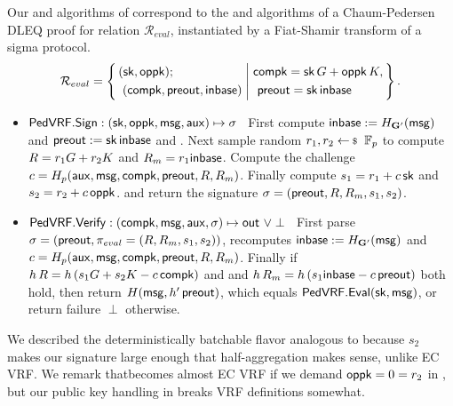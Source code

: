 Our \Sign and \Verify algorithms of \PedVRF correspond to
the \Prove and \Verify algorithms of a Chaum-Pedersen DLEQ proof
 for relation $\mathcal{R}_{eval}$,
instantiated by a Fiat-Shamir transform of a sigma protocol.
$$ \mathcal{R}_{eval} = \Setst{
  \begin{aligned}
    & (\sk, \openpk); \\ 
    & \,\, (\compk,\PreOut,\In) 
  \end{aligned}
}{
  \begin{aligned}
    & \compk = \sk\,\genG + \openpk\,\genB, \\
    & \,\, \PreOut = \sk\,\In 
  \end{aligned}
}  \mathperiod \label{rel:commit} 
$$
%
\begin{itemize}
	\item ${\mathsf{PedVRF}}.{\mathsf{Sign}} : (\mathsf{sk},\mathsf{oppk},\mathsf{msg},\mathsf{aux}) \mapsto \sigma$ \,
	First compute ${\mathsf{inbase}} := H_{{\mathbf{G}'}}(\mathsf{msg})$ and ${\mathsf{preout}} := \mathsf{sk} \, {\mathsf{inbase}}$ and \compk.
	Next sample random $r_1,r_2 \leftsample \F_p$
	to compute $R = r_1 G + r_2 K$ and $R_m = r_1 {\mathsf{inbase}}$.
	Compute the challenge $c = H_p(\mathsf{aux},\mathsf{msg},\mathsf{compk},{\mathsf{preout}},R,R_m)$.
	Finally compute $s_1 = r_1 + c \, \mathsf{sk}$ and $s_2 = r_2 + c \, \mathsf{oppk}$.
	and return the signature $\sigma = ({\mathsf{preout}},R,R_m,s_1,s_2)$.

	\item ${\mathsf{PedVRF}}.{\mathsf{Verify}} : (\mathsf{compk},\mathsf{msg},\mathsf{aux},\sigma) \mapsto {\ensuremath{\mathsf{out}}} \,\, \lor \perp$ \,
	First parse $\sigma = ({\mathsf{preout}}, \pi_{eval} = (R,R_m,s_1,s_2))$,
	recomputes ${\mathsf{inbase}} := H_{{\mathbf{G}'}}(\mathsf{msg})$ and 
	$c = H_p(\mathsf{aux},\mathsf{msg},\mathsf{compk},{\mathsf{preout}},R,R_m)$.
    Finally if $h \, R = h \, (s_1 G + s_2 K - c \, \mathsf{compk})$ and
    and $h \, R_m = h \, (s_1 {\mathsf{inbase}} - c \, {\mathsf{preout}})$ both hold,
    then return $H(\mathsf{msg}, {h'}\,{\mathsf{preout}})$, which equals ${\mathsf{PedVRF}}.{\mathsf{Eval}}(\mathsf{sk},\mathsf{msg})$,
    or return failure $\perp$ otherwise.
\end{itemize}
\noindent We described the deterministically batchable flavor analogous
to \cite{HdVBatchEd25519} because $s_2$ makes our signature large enough
that half-aggregation makes sense, unlike EC VRF.
We remark that\PedVRF becomes almost EC VRF if
 we demand $\mathsf{oppk} = 0 = r_2$ in \Sign,
but our public key handling in \PedVRF breaks VRF definitions somewhat.

